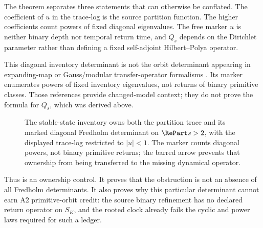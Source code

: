 The theorem separates three statements that can otherwise be conflated.
The coefficient of $u$ in the trace-log is the source partition function.
The higher coefficients count powers of fixed diagonal eigenvalues.  The
free marker $u$ is neither binary depth nor temporal return time, and $Q_s$
depends on the Dirichlet parameter rather than defining a fixed
self-adjoint Hilbert--Polya operator.

This diagonal inventory determinant is not the orbit determinant appearing
in expanding-map or Gauss/modular transfer-operator formalisms
\citep{ruelle1976zeta,mayer1990gauss,mayer1991selberg}.  Its marker enumerates
powers of fixed inventory eigenvalues, not returns of binary primitive
classes.  Those references provide changed-model context; they do not prove
the formula for $Q_s$, which was derived above.

\begin{figure}[H]
  \centering
  \resizebox{\textwidth}{!}{}
  \caption{The stable-state inventory owns both the partition trace and its
  marked diagonal Fredholm determinant on $\RePart s>2$, with the displayed
  trace-log restricted to $|u|<1$. The marker counts diagonal powers, not
  binary primitive returns; the barred arrow prevents that ownership from
  being transferred to the missing dynamical operator.}
  \label{fig:inventory-owner}
\end{figure}

Thus  is an ownership control.  It proves
that the obstruction is not an absence of all Fredholm determinants.  It
also proves why this particular determinant cannot earn A2 primitive-orbit
credit: the source binary refinement has no declared return operator on
$S_K$, and the rooted clock already fails the cyclic and power laws required
for such a ledger.

